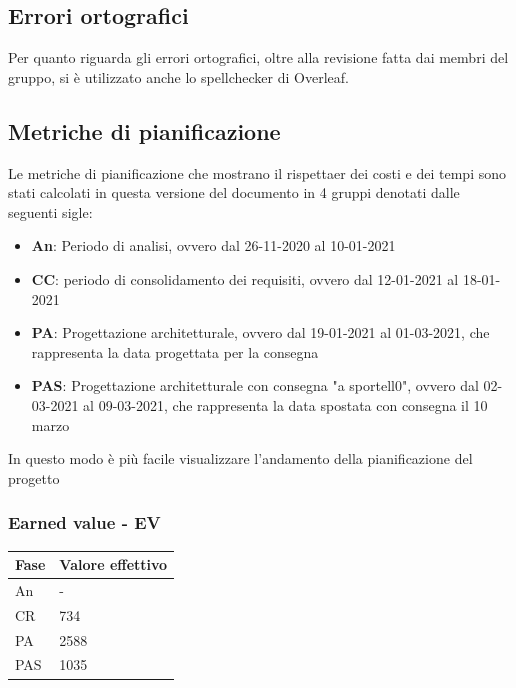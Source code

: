 \subsection{Errori ortografici}

Per quanto riguarda gli errori ortografici, oltre alla revisione fatta dai membri del gruppo, si è utilizzato anche lo spellchecker di Overleaf.
\newpage

\subsection{Metriche di pianificazione}
Le metriche di pianificazione che mostrano il rispettaer dei costi e dei tempi sono stati calcolati in questa versione del documento in 4 gruppi denotati dalle seguenti sigle:
\begin{itemize}
    \item \textbf{An}: Periodo di analisi, ovvero dal 26-11-2020 al 10-01-2021
    \item \textbf{CC}: periodo di consolidamento dei requisiti, ovvero dal 12-01-2021 al 18-01-2021
    \item \textbf{PA}: Progettazione architetturale, ovvero dal 19-01-2021 al 01-03-2021, che rappresenta la data progettata per la consegna
    \item \textbf{PAS}: Progettazione architetturale con consegna "a sportell0", ovvero dal 02-03-2021 al 09-03-2021, che rappresenta la data spostata con consegna il 10 marzo
\end{itemize}
In questo modo è più facile visualizzare l'andamento della pianificazione del progetto

\subsubsection{Earned value - EV}

\begin{longtabu} to \textwidth {| X[0.1,c m] | X[0.1,c m] |}
    \hline
    \textbf{Fase} &
    \textbf{Valore effettivo} \\
    \hline
    An & -  \\ 
    \hline
    CR & 734 \\
    \hline
    PA & 2588 \\
    \hline
    PAS & 1035 \\
    \hline 
    \end{longtabu}


